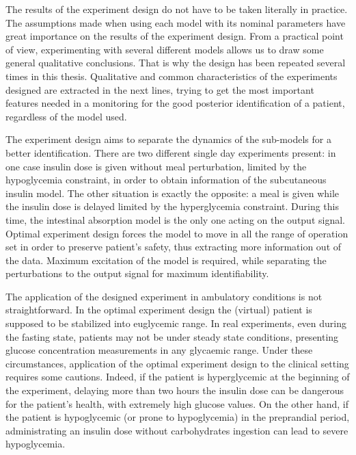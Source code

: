The results of the experiment design do not have to be taken literally in practice. The assumptions made when using each model with its nominal parameters have great importance on the results of the experiment design. From a practical point of view, experimenting with several different models allows us to draw some general qualitative conclusions. That is why the design has been repeated several times in this thesis. Qualitative and common characteristics of the experiments designed are extracted in the next lines, trying to get the most important features needed in a monitoring for the good posterior identification of a patient, regardless of the model used.

The experiment design aims to separate the dynamics of the sub-models for a better identification. There are two different single day experiments present: in one case insulin dose is given without meal perturbation, limited by the hypoglycemia constraint, in order to obtain information of the subcutaneous insulin model. The other situation is exactly the opposite: a meal is given while the insulin dose is delayed limited by the hyperglycemia constraint. During this time, the intestinal absorption model is the only one acting on the output signal. Optimal experiment design forces the model to move in all the range of operation set in order to preserve patient's safety, thus extracting more information out of the data. Maximum excitation of the model is required, while separating the perturbations to the output signal for maximum identifiability.

The application of the designed experiment in ambulatory conditions is not straightforward. In the optimal experiment design the (virtual) patient is supposed to be stabilized into euglycemic range. In real experiments, even during the fasting state, patients may not be under steady state conditions, presenting glucose concentration measurements in any glycaemic range. Under these circumstances, application of the optimal experiment design to the clinical setting requires some cautions. Indeed, if the patient is hyperglycemic at the beginning of the experiment, delaying more than two hours the insulin dose can be dangerous for the patient's health, with extremely high glucose values. On the other hand, if the patient is hypoglycemic (or prone to hypoglycemia) in the preprandial period, administrating an insulin dose without carbohydrates ingestion can lead to severe hypoglycemia. 

